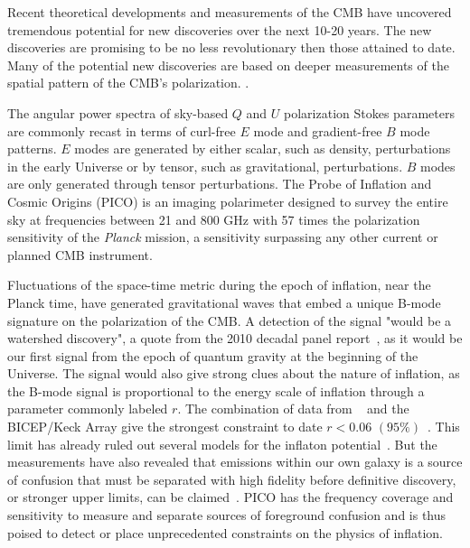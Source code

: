 \documentclass[PICOReport.tex]{subfiles}
\begin{document}

Recent theoretical developments and measurements of the \ac{CMB} 
have uncovered tremendous potential for new discoveries over the next 10-20 years. The new discoveries are promising to be 
no less revolutionary then those attained to date. Many of the potential new discoveries are based on deeper
measurements of the spatial pattern of the CMB's polarization. .

The angular power spectra of sky-based $Q$ and $U$ polarization Stokes parameters are commonly recast in terms
of curl-free $E$ mode and gradient-free $B$ mode patterns. $E$ modes are generated by either scalar, such as density, perturbations
in the early Universe or by tensor, such as gravitational, perturbations. $B$ modes are only generated through tensor
perturbations. The Probe of Inflation and Cosmic Origins (PICO) is an imaging polarimeter designed to survey the entire 
sky at frequencies between 21 and 800 GHz with 57 times the polarization sensitivity of the {\it Planck} mission, a sensitivity 
surpassing any other current or planned CMB instrument. 

Fluctuations of the space-time metric during the epoch of inflation, near the Planck time, have generated gravitational waves 
that embed a unique B-mode signature on the polarization of the CMB. A detection of the signal "would be a watershed discovery", 
a quote from the 2010 decadal panel report~\citep{nwnh}, as it would be our first signal from the epoch of quantum gravity 
at the beginning of the Universe. The signal would also give strong clues 
about the nature of inflation, as the B-mode signal is proportional to the energy scale of inflation through a parameter 
commonly labeled $r$. 
The combination of data from \planck~ and the BICEP/Keck Array give the strongest constraint to date 
$r<0.06\,\, (95\%)$~\citep{rlimit}.  This limit has already ruled out several 
models for the inflaton potential~\citep{planck2018inflation}. 
But the measurements have also 
revealed that emissions within our own galaxy is a source of confusion that must be separated with high fidelity 
before definitive discovery, or stronger upper limits, can be claimed~\citep{whichplanck}. 
PICO has the frequency coverage and sensitivity to measure and separate sources of foreground confusion and is thus 
poised to detect or place unprecedented constraints on the physics of inflation. 
\end{document}
